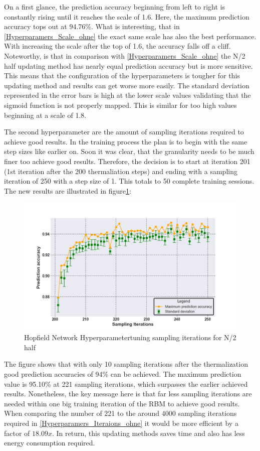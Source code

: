 On a first glance, the prediction accuracy beginning from left to right is constantly rising until it reaches the scale of 1.6.
Here, the maximum prediction accuracy tops out at 94.76\%.
What is interesting, that in \ref{Hyperparamers_Scale_ohne} the exact same scale has also the best performance. 
With increasing the scale after the top of 1.6, the accuracy falls off a cliff. 
Noteworthy, is that in comparison with \ref{Hyperparamers_Scale_ohne} the N/2 half updating method has nearly equal prediction accuracy
but is more sensitive. 
This means that the configuration of the hyperparameters is tougher for this updating method and results can get worse more easily. 
The standard deviation represented in the error bars is high at the lower scale values validating that the sigmoid function is not properly mapped. 
This is similar for too high values beginning at a scale of 1.8.

The second hyperparameter are the amount of sampling iterations required to achieve good results. 
In the training process the plan is to begin with the same step sizes like earlier on. Soon it was clear,
that the granularity needs to be much finer too achieve good results. 
Therefore, the decision is to start at iteration 201 (1st iteration after the 200 thermaliation steps) and ending with a sampling iteration of 250 with a step size of 1.
This totals to 50 complete training sessions. The new results are illustrated in figure\ref{Hyperparamers_Iteraions_mit}:
\begin{figure}[H]
    \centering
    \includegraphics[width=0.9\linewidth]{graphics/Iterations_MIT_N2_Half_Pred_Acc.png}
    \caption{Hopfield Network Hyperparametertuning sampling iterations for N/2 half}
    \label{Hyperparamers_Iteraions_mit}
\end{figure}
The figure shows that with only 10 sampling iterations after the thermalization good prediction accuracies of 94\% can be achieved. 
The maximum prediction value is 95.10\% at 221 sampling iterations, which surpasses the earlier achieved results.
Nonetheless, the key message here is that far less sampling iterations are needed within one big training iteration of the \ac{RBM}
to achieve good results. 
When comparing the number of 221 to the around 4000 sampling iterations required in \ref{Hyperparamers_Iteraions_ohne} it would be more efficient by a factor of 
\(18.09x\). In return, this updating methods saves time and also has less energy consumption required.

